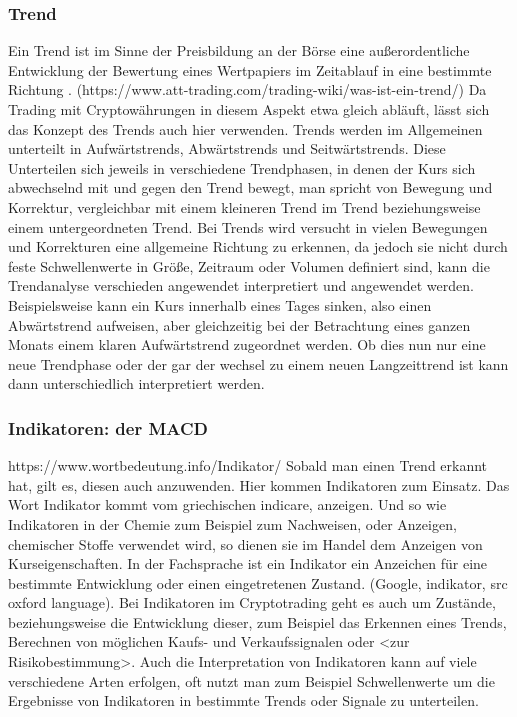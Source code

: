 \documentclass[12pt]{article}
\begin{document}
	\subsubsection{Trend}
		\glqq Ein Trend ist im Sinne der Preisbildung an der Börse eine außerordentliche Entwicklung der Bewertung eines Wertpapiers im Zeitablauf in eine bestimmte Richtung \grqq{}.  (https://www.att-trading.com/trading-wiki/was-ist-ein-trend/) Da Trading mit Cryptowährungen in diesem Aspekt etwa gleich abläuft, lässt sich das Konzept des Trends auch hier verwenden. Trends werden im Allgemeinen unterteilt in Aufwärtstrends, Abwärtstrends und Seitwärtstrends. Diese Unterteilen sich jeweils in verschiedene Trendphasen, in denen der Kurs sich abwechselnd mit und gegen den Trend bewegt, man spricht von Bewegung und Korrektur, vergleichbar mit einem kleineren Trend im Trend beziehungsweise einem untergeordneten Trend. Bei Trends wird versucht in vielen Bewegungen und Korrekturen eine allgemeine Richtung zu erkennen, da jedoch sie nicht durch feste Schwellenwerte in Größe, Zeitraum oder Volumen definiert sind, kann die Trendanalyse verschieden angewendet interpretiert und angewendet werden. Beispielsweise kann ein Kurs innerhalb eines Tages sinken, also einen Abwärtstrend aufweisen, aber gleichzeitig bei der Betrachtung eines ganzen Monats einem klaren Aufwärtstrend zugeordnet werden. Ob dies nun nur eine neue Trendphase oder der gar der wechsel zu einem neuen Langzeittrend ist kann dann unterschiedlich interpretiert werden.
	\subsubsection{Indikatoren: der MACD}
		https://www.wortbedeutung.info/Indikator/ Sobald man einen Trend erkannt hat, gilt es, diesen auch anzuwenden. Hier kommen Indikatoren zum Einsatz. Das Wort Indikator kommt vom griechischen indicare, \glqq anzeigen\grqq{}. Und so wie Indikatoren in der Chemie zum Beispiel zum Nachweisen, oder Anzeigen, chemischer Stoffe verwendet wird, so dienen sie im Handel dem Anzeigen von Kurseigenschaften. In der Fachsprache ist ein Indikator ein Anzeichen für eine bestimmte Entwicklung oder einen eingetretenen Zustand. (Google, indikator, src oxford language). Bei Indikatoren im Cryptotrading geht es auch um Zustände, beziehungsweise die Entwicklung dieser, zum Beispiel das Erkennen eines Trends, Berechnen von möglichen Kaufs- und Verkaufssignalen oder <zur Risikobestimmung>. Auch die Interpretation von Indikatoren kann auf viele verschiedene Arten erfolgen, oft nutzt man zum Beispiel Schwellenwerte um die Ergebnisse von Indikatoren in bestimmte Trends oder Signale zu unterteilen.
\end{document}
